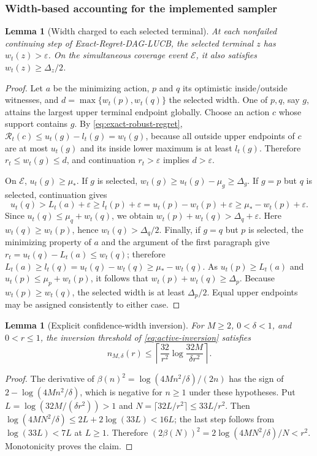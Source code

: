 \documentclass{article}
\theoremstyle{plain}
\newtheorem{lemma}[theorem]{Lemma}
\theoremstyle{definition}
\begin{document}
\subsubsection{Width-based accounting for the implemented sampler}
\begin{lemma}[Width charged to each selected terminal]
\label{lem:active-width}
At each nonfailed continuing step of Exact-Regret-DAG-LUCB, the selected terminal $z$ has $w_t(z)>\varepsilon$. On the simultaneous coverage event $\mathcal E$, it also satisfies $w_t(z)\ge\Delta_z/2$.
\end{lemma}
\begin{proof}
Let $a$ be the minimizing action, $p$ and $q$ its optimistic inside/outside witnesses, and $d=\max\{w_t(p),w_t(q)\}$ the selected width. One of $p,q$, say $g$, attains the largest upper terminal endpoint globally. Choose an action $c$ whose support contains $g$. By \cref{eq:exact-robust-regret}, $\mathcal R_t(c)\le u_t(g)-l_t(g)=w_t(g)$, because all outside upper endpoints of $c$ are at most $u_t(g)$ and its inside lower maximum is at least $l_t(g)$. Therefore $r_t\le w_t(g)\le d$, and continuation $r_t>\varepsilon$ implies $d>\varepsilon$.

On $\mathcal E$, $u_t(g)\ge\mu_*$. If $g$ is selected, $w_t(g)\ge u_t(g)-\mu_g\ge\Delta_g$. If $g=p$ but $q$ is selected, continuation gives
\[
 u_t(q)>L_t(a)+\varepsilon\ge l_t(p)+\varepsilon
 =u_t(p)-w_t(p)+\varepsilon\ge\mu_*-w_t(p)+\varepsilon.
\]
Since $u_t(q)\le\mu_q+w_t(q)$, we obtain $w_t(p)+w_t(q)>\Delta_q+\varepsilon$. Here $w_t(q)\ge w_t(p)$, hence $w_t(q)>\Delta_q/2$.
Finally, if $g=q$ but $p$ is selected, the minimizing property of $a$ and the argument of the first paragraph give $r_t=u_t(q)-L_t(a)\le w_t(q)$; therefore $L_t(a)\ge l_t(q)=u_t(q)-w_t(q)\ge\mu_*-w_t(q)$. As $u_t(p)\ge L_t(a)$ and $u_t(p)\le\mu_p+w_t(p)$, it follows that $w_t(p)+w_t(q)\ge\Delta_p$. Because $w_t(p)\ge w_t(q)$, the selected width is at least $\Delta_p/2$. Equal upper endpoints may be assigned consistently to either case.
\end{proof}

\begin{lemma}[Explicit confidence-width inversion]
\label{lem:active-inversion}
For $M\ge2$, $0<\delta<1$, and $0<r\le1$, the inversion threshold of \cref{eq:active-inversion} satisfies
\[
 n_{M,\delta}(r)\le\left\lceil\frac{32}{r^2}\log\frac{32M}{\delta r^2}\right\rceil.
\]
\end{lemma}
\begin{proof}
The derivative of $\beta(n)^2=\log(4Mn^2/\delta)/(2n)$ has the sign of $2-\log(4Mn^2/\delta)$, which is negative for $n\ge1$ under these hypotheses. Put $L=\log(32M/(\delta r^2))>1$ and $N=\lceil32L/r^2\rceil\le33L/r^2$. Then $\log(4MN^2/\delta)\le2L+2\log(33L)<16L$; the last step follows from $\log(33L)<7L$ at $L\ge1$. Therefore $(2\beta(N))^2=2\log(4MN^2/\delta)/N<r^2$. Monotonicity proves the claim.
\end{proof}
\end{document}
